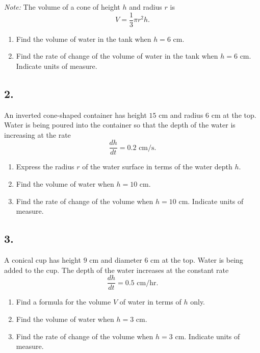\documentclass[12pt,a4paper]{article}
\begin{document}
\textit{Note:} The volume of a cone of height $h$ and radius $r$ is
\[
V=\frac{1}{3}\pi r^2h.
\]

\begin{enumerate}[label=(\alph*)]
    \item Find the volume of water in the tank when $h=6\text{ cm}$.
    
    \item Find the rate of change of the volume of water in the tank when $h=6\text{ cm}$. Indicate units of measure.
\end{enumerate}

\subsection*{2. \quad [20 points]}

An inverted cone-shaped container has height $15\text{ cm}$ and radius $6\text{ cm}$ at the top. Water is being poured into the container so that the depth of the water is increasing at the rate
\[
\frac{dh}{dt}=0.2\text{ cm/s}.
\]

\begin{enumerate}[label=(\alph*)]
    \item Express the radius $r$ of the water surface in terms of the water depth $h$.
    
    \item Find the volume of water when $h=10\text{ cm}$.
    
    \item Find the rate of change of the volume when $h=10\text{ cm}$. Indicate units of measure.
\end{enumerate}

\subsection*{3. \quad [20 points]}

A conical cup has height $9\text{ cm}$ and diameter $6\text{ cm}$ at the top. Water is being added to the cup. The depth of the water increases at the constant rate
\[
\frac{dh}{dt}=0.5\text{ cm/hr}.
\]

\begin{enumerate}[label=(\alph*)]
    \item Find a formula for the volume $V$ of water in terms of $h$ only.
    
    \item Find the volume of water when $h=3\text{ cm}$.
    
    \item Find the rate of change of the volume when $h=3\text{ cm}$. Indicate units of measure.
\end{enumerate}
\end{document}
